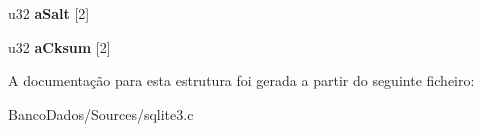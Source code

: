 \begin{DoxyCompactItemize}
\item 
\hypertarget{struct_wal_index_hdr_af99b92f673fd7ba1e4e4f9feb955453f}{u32 {\bfseries a\-Salt} \mbox{[}2\mbox{]}}\label{struct_wal_index_hdr_af99b92f673fd7ba1e4e4f9feb955453f}

\item 
\hypertarget{struct_wal_index_hdr_aa202339b02766d088717bfce9e3a9c0e}{u32 {\bfseries a\-Cksum} \mbox{[}2\mbox{]}}\label{struct_wal_index_hdr_aa202339b02766d088717bfce9e3a9c0e}

\end{DoxyCompactItemize}


A documentação para esta estrutura foi gerada a partir do seguinte ficheiro\-:\begin{DoxyCompactItemize}
\item 
Banco\-Dados/\-Sources/sqlite3.\-c\end{DoxyCompactItemize}
